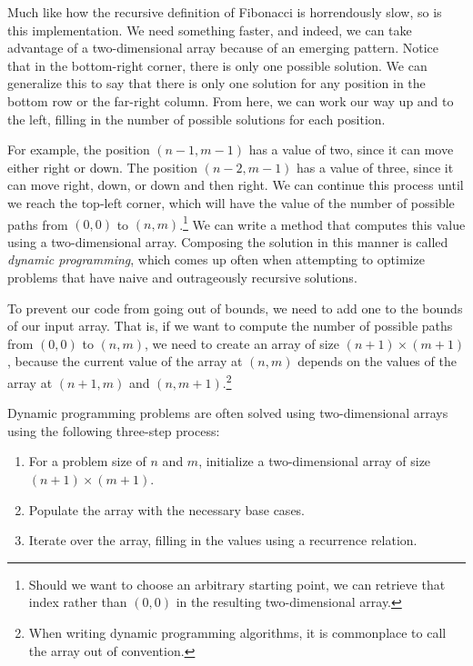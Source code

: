 Much like how the recursive definition of Fibonacci is horrendously slow, so is this implementation. We need something faster, and indeed, we can take advantage of a two-dimensional array because of an emerging pattern. Notice that in the bottom-right corner, there is only one possible solution. We can generalize this to say that there is only one solution for any position in the bottom row or the far-right column. From here, we can work our way up and to the left, filling in the number of possible solutions for each position. 

For example, the position $(n - 1, m - 1)$ has a value of two, since it can move either right or down. The position $(n - 2, m - 1)$ has a value of three, since it can move right, down, or down and then right. We can continue this process until we reach the top-left corner, which will have the value of the number of possible paths from $(0, 0)$ to $(n, m)$.\footnote{Should we want to choose an arbitrary starting point, we can retrieve that index rather than $(0, 0)$ in the resulting two-dimensional array.} We can write a method that computes this value using a two-dimensional array. Composing the solution in this manner is called \emph{dynamic programming}, which comes up often when attempting to optimize problems that have naive and outrageously recursive solutions.

To prevent our code from going out of bounds, we need to add one to the bounds of our input array. That is, if we want to compute the number of possible paths from $(0, 0)$ to $(n, m)$, we need to create an array of size $(n + 1) \times (m + 1)$, because the current value of the array at $(n, m)$ depends on the values of the array at $(n + 1, m)$ and $(n, m + 1)$.\footnote{When writing dynamic programming algorithms, it is commonplace to call the array  out of convention.} 

Dynamic programming problems are often solved using two-dimensional arrays using the following three-step process: 

\begin{enumerate}
  \item For a problem size of $n$ and $m$, initialize a two-dimensional array of size $(n + 1) \times (m + 1)$.
  \item Populate the array with the necessary base cases.
  \item Iterate over the array, filling in the values using a recurrence relation.
\end{enumerate}

